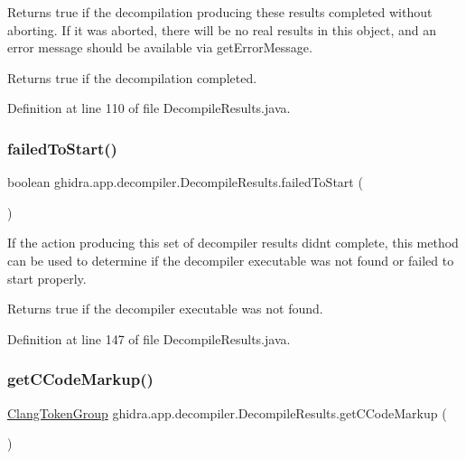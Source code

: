 Returns true if the decompilation producing these results completed without aborting. If it was aborted, there will be no real results in this object, and an error message should be available via get\+Error\+Message. \begin{DoxyReturn}{Returns}
true if the decompilation completed. 
\end{DoxyReturn}


Definition at line 110 of file Decompile\+Results.\+java.

\mbox{\label{classghidra_1_1app_1_1decompiler_1_1_decompile_results_a4b0eb77c8b21c1eba93df8539102b9f0}} 
\subsubsection{\texorpdfstring{failedToStart()}{failedToStart()}}
{\footnotesize\ttfamily boolean ghidra.\+app.\+decompiler.\+Decompile\+Results.\+failed\+To\+Start (\begin{DoxyParamCaption}{ }\end{DoxyParamCaption})\hspace{0.3cm}{\ttfamily [inline]}}

If the action producing this set of decompiler results didn\textquotesingle{}t complete, this method can be used to determine if the decompiler executable was not found or failed to start properly. \begin{DoxyReturn}{Returns}
true if the decompiler executable was not found. 
\end{DoxyReturn}


Definition at line 147 of file Decompile\+Results.\+java.

\mbox{\label{classghidra_1_1app_1_1decompiler_1_1_decompile_results_a1ca085b179f273b38e002f2b2f24cb5d}} 
\subsubsection{\texorpdfstring{getCCodeMarkup()}{getCCodeMarkup()}}
{\footnotesize\ttfamily \mbox{\hyperlink{classghidra_1_1app_1_1decompiler_1_1_clang_token_group}{Clang\+Token\+Group}} ghidra.\+app.\+decompiler.\+Decompile\+Results.\+get\+C\+Code\+Markup (\begin{DoxyParamCaption}{ }\end{DoxyParamCaption})\hspace{0.3cm}{\ttfamily [inline]}}


